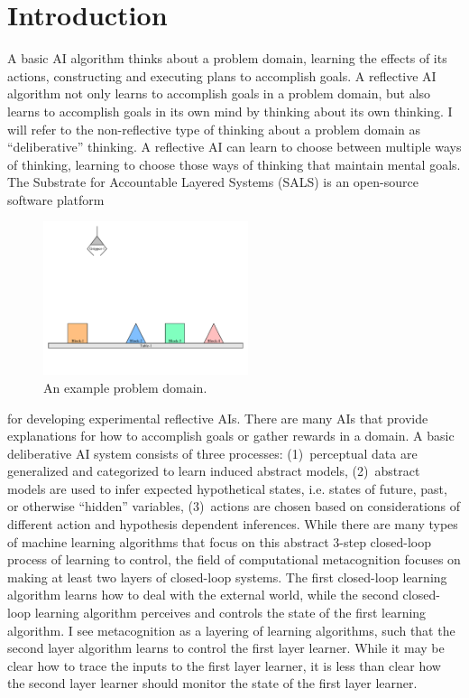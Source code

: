 \chapter{Introduction}
\label{chapter:introduction}

A basic AI algorithm thinks about a problem domain, learning the
effects of its actions, constructing and executing plans to accomplish
goals.  A reflective AI algorithm not only learns to accomplish goals
in a problem domain, but also learns to accomplish goals in its own
mind by thinking about its own thinking.  I will refer to the
non-reflective type of thinking about a problem domain as
``deliberative'' thinking.  A reflective AI can learn to choose
between multiple ways of thinking, learning to choose those ways of
thinking that maintain mental goals.  The Substrate for Accountable
Layered Systems (SALS) is an open-source software platform
\begin{figure}
  \includegraphics[width=6cm]{gfx/blocks_world_large-01}
  \caption[An example problem domain.]{An example problem domain.}
  \label{figure:introduction_example_problem_domain}
\end{figure}
for developing experimental reflective AIs.  There are many AIs that
provide explanations for how to accomplish goals or gather rewards in
a domain.  A basic deliberative AI system consists of three processes:
{\mbox{(1)~perceptual}} data are generalized and categorized to learn
induced abstract models, {\mbox{(2)~abstract}} models are used to
infer expected hypothetical states, i.e. states of future, past, or
otherwise ``hidden'' variables, {\mbox{(3)~actions}} are chosen based
on considerations of different action and hypothesis dependent
inferences.  While there are many types of machine learning algorithms
that focus on this abstract 3-step closed-loop process of learning to
control, the field of computational metacognition
\cite[]{cox_and_raja:2008,cox:2010} focuses on making at least two
layers of closed-loop systems.  The first closed-loop learning
algorithm learns how to deal with the external world, while the second
closed-loop learning algorithm perceives and controls the state of the
first learning algorithm.  I see metacognition as a layering of
learning algorithms, such that the second layer algorithm learns to
control the first layer learner.  While it may be clear how to trace
the inputs to the first layer learner, it is less than clear how the
second layer learner should monitor the state of the first layer
learner.

